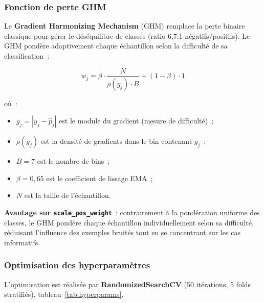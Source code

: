 \documentclass[12pt, a4paper, twocolumn]{article}
\begin{document}
\subsubsection{Fonction de perte GHM}
\label{subsubsec:ghm}

Le \textbf{Gradient Harmonizing Mechanism} (GHM) \cite{li2019} remplace la perte binaire classique pour gérer le déséquilibre de classes (ratio 6,7:1 négatifs/positifs). Le GHM pondère adaptivement chaque échantillon selon la difficulté de sa classification~:

\begin{equation}
\label{eq:ghm}
  w_j = \beta \cdot \frac{N}{\rho(g_j) \cdot B} + (1 - \beta) \cdot 1
\end{equation}

\noindent où~:
\begin{itemize}[leftmargin=*]
  \item $g_j = |y_j - \hat{p}_j|$ est le module du gradient (mesure de difficulté)~;
  \item $\rho(g_j)$ est la densité de gradients dans le bin contenant $g_j$~;
  \item $B = 7$ est le nombre de bins~;
  \item $\beta = 0{,}65$ est le coefficient de lissage EMA~;
  \item $N$ est la taille de l'échantillon.
\end{itemize}

\textbf{Avantage sur \texttt{scale\_pos\_weight}}~: contrairement à la pondération uniforme des classes, le GHM pondère chaque échantillon individuellement selon sa difficulté, réduisant l'influence des exemples bruités tout en se concentrant sur les cas informatifs.

\subsubsection{Optimisation des hyperparamètres}
\label{subsubsec:hyperparams}

L'optimisation est réalisée par \textbf{RandomizedSearchCV} (50 itérations, 5 folds stratifiés), tableau~\ref{tab:hyperparams}.
\end{document}
